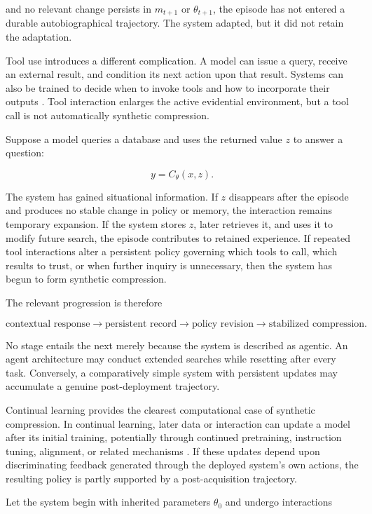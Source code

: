 \documentclass[11pt]{article}
\begin{document}
and no relevant change persists in $m_{t+1}$ or $\theta_{t+1}$, the episode has not entered a durable autobiographical trajectory. The system adapted, but it did not retain the adaptation.

Tool use introduces a different complication. A model can issue a query, receive an external result, and condition its next action upon that result. Systems can also be trained to decide when to invoke tools and how to incorporate their outputs \cite{schick2023}. Tool interaction enlarges the active evidential environment, but a tool call is not automatically synthetic compression.

Suppose a model queries a database and uses the returned value $z$ to answer a question:

\[
y
=
C_{\theta}(x,z).
\]

The system has gained situational information. If $z$ disappears after the episode and produces no stable change in policy or memory, the interaction remains temporary expansion. If the system stores $z$, later retrieves it, and uses it to modify future search, the episode contributes to retained experience. If repeated tool interactions alter a persistent policy governing which tools to call, which results to trust, or when further inquiry is unnecessary, then the system has begun to form synthetic compression.

The relevant progression is therefore

\[
\text{contextual response}
\longrightarrow
\text{persistent record}
\longrightarrow
\text{policy revision}
\longrightarrow
\text{stabilized compression}.
\]

No stage entails the next merely because the system is described as agentic. An agent architecture may conduct extended searches while resetting after every task. Conversely, a comparatively simple system with persistent updates may accumulate a genuine post-deployment trajectory.

Continual learning provides the clearest computational case of synthetic compression. In continual learning, later data or interaction can update a model after its initial training, potentially through continued pretraining, instruction tuning, alignment, or related mechanisms \cite{wu2024}. If these updates depend upon discriminating feedback generated through the deployed system's own actions, the resulting policy is partly supported by a post-acquisition trajectory.

Let the system begin with inherited parameters $\theta_0$ and undergo interactions
\end{document}
